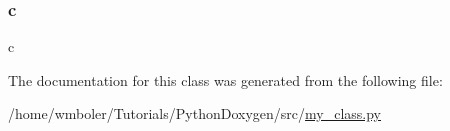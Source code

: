 \mbox{\label{classsrc_1_1my__class_1_1MyClass_ae0323a9039add2978bf5b49550572c7c}} 
\subsubsection{\texorpdfstring{c}{c}}
{\footnotesize\ttfamily c}



The documentation for this class was generated from the following file\+:\begin{DoxyCompactItemize}
\item 
/home/wmboler/\+Tutorials/\+Python\+Doxygen/src/\hyperlink{my__class_8py}{my\+\_\+class.\+py}\end{DoxyCompactItemize}
